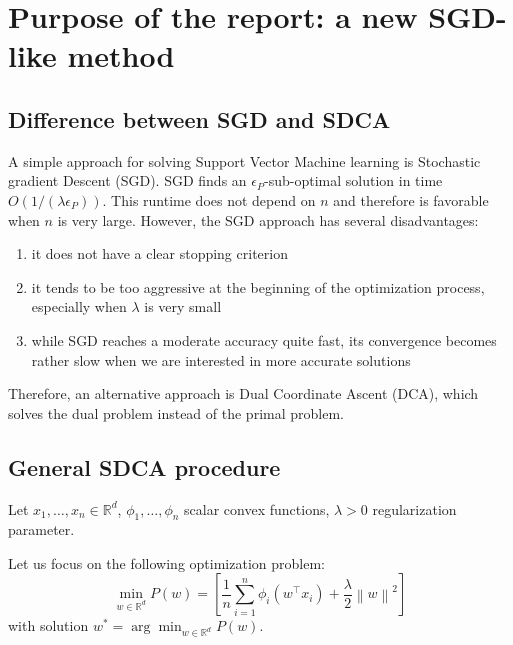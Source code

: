 \documentclass{article}
\newcommand{\norm}[1]{\left\|#1 \right\|}
\begin{document}
\section{Purpose of the report: a new SGD-like method}

\subsection{Difference between SGD and SDCA}


A simple approach for solving Support Vector Machine learning is Stochastic gradient Descent (SGD).
SGD finds an $\epsilon_P$-sub-optimal solution in time $O(1/(\lambda \epsilon_P))$.
This runtime does not depend on $n$ and therefore is favorable when $n$ is very large.
However, the SGD approach has several disadvantages:

\begin{enumerate}
    \item it does not have a clear stopping criterion
    \item it tends to be too aggressive at the beginning of the optimization process, especially when $\lambda$ is very small
    \item while SGD reaches a moderate accuracy quite fast, its convergence becomes rather slow when we are interested in more accurate solutions
\end{enumerate}

Therefore, an alternative approach is Dual Coordinate Ascent (DCA), which solves the dual problem instead of the primal problem.

\subsection{General SDCA procedure}

Let $x_1, \dots, x_n \in \mathbb{R}^d$, $\phi_1, \dots, \phi_n$ scalar convex functions, $\lambda > 0$ regularization parameter.

Let us focus on the following optimization problem:
\begin{equation}
    \min_{w \in \mathbb{R}^d} P(w) = \left[ \dfrac{1}{n} \sum_{i=1}^n \phi_i(w^\top x_i) + \dfrac{\lambda}{2}\norm{w}^2 \right]
    \label{primal}
\end{equation}
with solution $w^{*} = \arg \min_{w \in \mathbb{R}^d} P(w)$.
\end{document}
